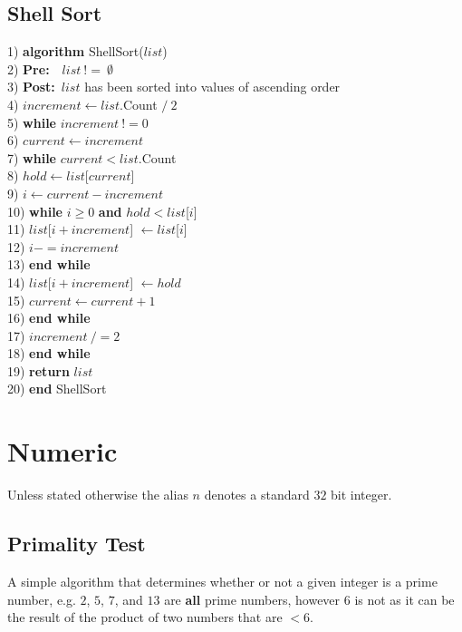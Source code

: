 \documentclass[10pt,oneside,a4paper]{report}
\begin{document}
\section{Shell Sort}
\begin{tabbing}
1)  \textbf{alg}\= \textbf{orithm} ShellSort($list$) \\
2)  \> \textbf{Pre:}~~$list~!=~\emptyset$ \\
3)  \> \textbf{Post:}~$list$ has been sorted into values of ascending order \\
4)  \> $increment \leftarrow list$.Count $/~2$ \\
5)  \> \textbf{whi}\= \textbf{le} $increment~!= 0$ \\
6)  \> \> $current \leftarrow increment$ \\
7)  \> \> \textbf{whi}\= \textbf{le} $current < list$.Count \\
8)  \> \> \> $hold \leftarrow list$[$current$] \\
9)  \> \> \> $i \leftarrow current - increment$ \\
10) \> \> \> \textbf{whi}\= \textbf{le} $i \geq 0$ \textbf{and} $hold < list$[$i$] \\
11) \> \> \> \> $list$[$i + increment$] $\leftarrow list$[$i$] \\
12) \> \> \> \> $i -= increment$ \\
13) \> \> \> \textbf{end while} \\
14) \> \> \> $list$[$i + increment$] $\leftarrow hold$ \\
15) \> \> \> $current \leftarrow current + 1$ \\
16) \> \> \textbf{end while} \\
17) \> \> $increment~/= 2$ \\
18) \> \textbf{end while} \\
19) \> \textbf{return} $list$ \\
20) \textbf{end} ShellSort \\
\end{tabbing}

\chapter{Numeric}
Unless stated otherwise the alias $n$ denotes a standard $32$ bit integer.

\section{Primality Test} \label{cha:Primality}
A simple algorithm that determines whether or not a given integer is a prime number, e.g. $2$, $5$, $7$, and $13$ are \textbf{all} prime numbers, however $6$ is not as it can be the result of the product of two numbers that are $< 6$.
\end{document}
